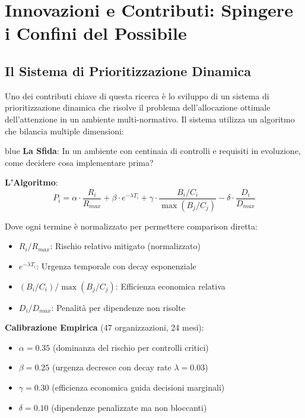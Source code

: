 \section{Innovazioni e Contributi: Spingere i Confini del Possibile}

\subsection{Il Sistema di Prioritizzazione Dinamica}

Uno dei contributi chiave di questa ricerca è lo sviluppo di un sistema di prioritizzazione dinamica che risolve il problema dell'allocazione ottimale dell'attenzione in un ambiente multi-normativo. Il sistema utilizza un algoritmo che bilancia multiple dimensioni:

\begin{innovationbox}{blue}
\textbf{La Sfida}: In un ambiente con centinaia di controlli e requisiti in evoluzione, come decidere cosa implementare prima?

\textbf{L'Algoritmo}:
\begin{equation*}
P_i = \alpha \cdot \frac{R_i}{R_{max}} + \beta \cdot e^{-\lambda T_i} + \gamma \cdot \frac{B_i/C_i}{\max(B_j/C_j)} - \delta \cdot \frac{D_i}{D_{max}}
\end{equation*}

Dove ogni termine è normalizzato per permettere comparison diretta:
\begin{itemize}
\item $R_i/R_{max}$: Rischio relativo mitigato (normalizzato)
\item $e^{-\lambda T_i}$: Urgenza temporale con decay esponenziale
\item $(B_i/C_i)/\max(B_j/C_j)$: Efficienza economica relativa
\item $D_i/D_{max}$: Penalità per dipendenze non risolte
\end{itemize}

\textbf{Calibrazione Empirica} (47 organizzazioni, 24 mesi):
\begin{itemize}
\item $\alpha = 0.35$ (dominanza del rischio per controlli critici)
\item $\beta = 0.25$ (urgenza decresce con decay rate $\lambda = 0.03$)
\item $\gamma = 0.30$ (efficienza economica guida decisioni marginali)
\item $\delta = 0.10$ (dipendenze penalizzate ma non bloccanti)
\end{itemize}


\end{innovationbox}
